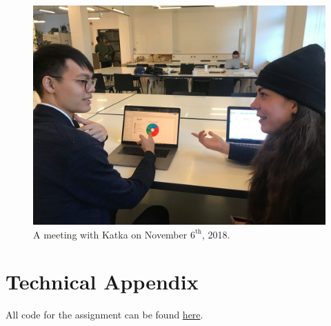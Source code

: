 \documentclass{article}
\begin{document}
	
\begin{figure}[h]
\center
\includegraphics[scale = 0.2]{katka.jpg}
\caption{A meeting with Katka on November $6^{\textrm{th}}$, 2018.}
\end{figure}

\section*{Technical Appendix}
All code for the assignment can be found \href{https://github.com/thetruejacob/B166/blob/master/Forecasting%20Assingment/HoltWinters%20and%20ARIMA.ipynb}{here}.





	
\end{document}
